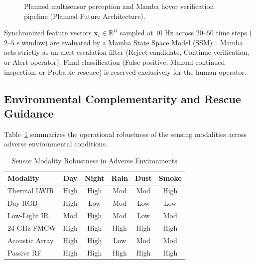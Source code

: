\begin{figure}[t]
{%
}
\caption{Planned multisensor perception and Mamba hover verification pipeline (Planned Future Architecture).}
\label{fig:mamba_fusion_pipeline}
\end{figure}

Synchronized feature vectors $\mathbf{x}_t \in \mathbb{R}^D$ sampled at $10\text{ Hz}$ across $20\text{--}50$ time steps ($2\text{--}5\text{ s}$ window) are evaluated by a Mamba State Space Model (SSM)~\cite{goodrich2008towards}. Mamba acts strictly as an alert escalation filter (Reject candidate, Continue verification, or Alert operator). Final classification (False positive, Manual continued inspection, or Probable rescuee) is reserved exclusively for the human operator.

\subsection{Environmental Complementarity and Rescue Guidance}
Table~\ref{tab:environmental_complementarity} summarizes the operational robustness of the sensing modalities across adverse environmental conditions.

\begin{table}[t]
\caption{Sensor Modality Robustness in Adverse Environments}
\label{tab:environmental_complementarity}
\centering
\footnotesize
\begin{tabular*}{\columnwidth}{@{\extracolsep{\fill}}lccccc@{}}
\toprule
\textbf{Modality} & \textbf{Day} & \textbf{Night} & \textbf{Rain} & \textbf{Dust} & \textbf{Smoke} \\
\midrule
Thermal LWIR & High & High & Mod & Mod & High \\
Day RGB & High & Low & Mod & Low & Low \\
Low-Light IR & Mod & High & Mod & Low & Mod \\
24 GHz FMCW & High & High & High & High & High \\
Acoustic Array & High & High & Low & Mod & Mod \\
Passive RF & High & High & High & High & High \\
\bottomrule
\end{tabular*}
\end{table}

